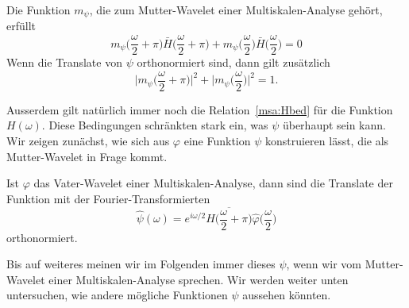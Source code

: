 \begin{satz}
Die Funktion $m_\psi$, die zum Mutter-Wavelet einer Multiskalen-Analyse 
gehört, erfüllt
\[
m_{\psi}\biggl(\frac{\omega}2+\pi\biggr)
\bar{H}\biggl(\frac{\omega}2+\pi\biggr)
+
m_{\psi}\biggl(\frac{\omega}2\biggr)
\bar{H}\biggl(\frac{\omega}2\biggr)
=
0
\]
Wenn die Translate von $\psi$ orthonormiert sind, dann gilt
zusätzlich
\[
\biggl|m_\psi\biggl(\frac{\omega}2+\pi\biggr)\biggr|^2
+
\biggl|m_\psi\biggl(\frac{\omega}2\biggr)\biggr|^2
=
1.
\]
\end{satz}

Ausserdem gilt natürlich immer noch die Relation~\eqref{msa:Hbed}
für die Funktion $H(\omega)$.
Diese Bedingungen schränkten stark ein, was $\psi$ überhaupt sein
kann.
Wir zeigen zunächst, wie sich aus $\varphi$ eine Funktion $\psi$
konstruieren lässt, die als Mutter-Wavelet in Frage kommt.

\begin{lemma}
\label{lemma:msa:psivorschlag}
Ist $\varphi$ das Vater-Wavelet einer Multiskalen-Analyse, dann sind die
Translate der Funktion mit der Fourier-Transformierten
\begin{equation}
\hat{\psi}(\omega)
=
e^{i\omega/2}
\overline{H\biggl(\frac{\omega}2+\pi\biggr)}
\hat{\varphi}\biggl(\frac{\omega}2\biggr)
\label{msa:psivorschlag}
\end{equation}
orthonormiert.
\end{lemma}

Bis auf weiteres meinen wir im Folgenden immer dieses $\psi$, wenn wir
vom Mutter-Wavelet einer Multiskalen-Analyse sprechen.
Wir werden weiter unten untersuchen, wie andere mögliche Funktionen 
$\psi$ aussehen könnten.

